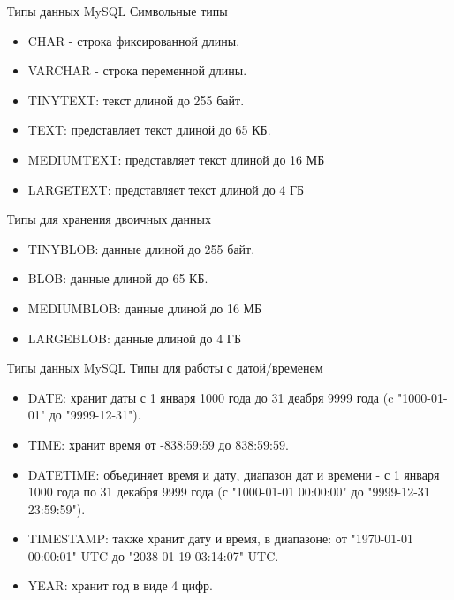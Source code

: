 \documentclass{beamer}
\begin{document}
\begin{frame}{Типы данных MySQL}
	Символьные типы
	\begin{itemize}
		\item CHAR - строка фиксированной длины.
		\item VARCHAR - строка переменной длины.
		\item TINYTEXT: текст длиной до 255 байт.
		\item TEXT: представляет текст длиной до 65 КБ.
		\item MEDIUMTEXT: представляет текст длиной до 16 МБ
		\item LARGETEXT: представляет текст длиной до 4 ГБ
	\end{itemize}
	Типы для хранения двоичных данных
	\begin{itemize}
		\item TINYBLOB: данные длиной до 255 байт.
		\item BLOB: данные длиной до 65 КБ.
		\item MEDIUMBLOB: данные длиной до 16 МБ
		\item LARGEBLOB: данные длиной до 4 ГБ
	\end{itemize}
\end{frame}

\begin{frame}{Типы данных MySQL}
	Типы для работы с датой/временем
	\begin{itemize}
		\item DATE: хранит даты с 1 января 1000 года до 31 деабря 9999 года (c "1000-01-01" до "9999-12-31"). 
		\item TIME: хранит время от -838:59:59 до 838:59:59. 
		\item DATETIME: объединяет время и дату, диапазон дат и времени - с 1 января 1000 года по 31 декабря 9999 		года (с "1000-01-01 00:00:00" до "9999-12-31 23:59:59"). 
		\item TIMESTAMP: также хранит дату и время, в диапазоне: от "1970-01-01 00:00:01" UTC до "2038-01-19 03:14:07" UTC. 
		\item YEAR: хранит год в виде 4 цифр. 
	\end{itemize}
\end{frame}
\end{document}
